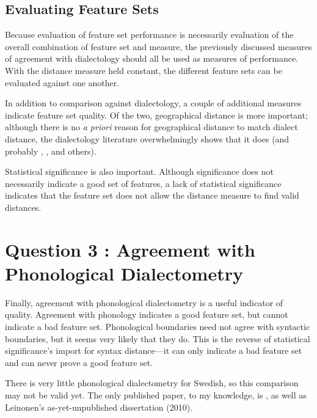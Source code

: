 \subsection{Evaluating Feature Sets}

Because evaluation of feature set performance is necessarily evaluation
of the overall combination of feature set and measure, the previously
discussed measures of agreement with dialectology should all be used
as measures of performance. With the distance measure held constant,
the different feature sets can be evaluated against one another.

In addition to comparison against dialectology, a couple of additional
measures indicate feature set quality. Of the two, geographical
distance is more important; although there is no {\it a priori} reason
for geographical distance to match dialect distance, the dialectology
literature overwhelmingly shows that it does \cite{gooskens04a} (and
probably \cite{heeringa04}, \cite{kondrak02}, and others).

Statistical significance is also important. Although significance does not
necessarily indicate a good set of features, a lack of statistical
significance indicates that the feature set does not allow the distance
measure to find valid distances.

\section{Question 3 : Agreement with Phonological Dialectometry}

Finally, agreement with phonological dialectometry is a useful
indicator of quality. Agreement with phonology indicates a good
feature set, but cannot indicate a bad feature set. Phonological
boundaries need not agree with syntactic boundaries, but it seems very
likely that they do. This is the reverse of statistical significance's
import for syntax distance---it can only indicate a bad feature set
and can never prove a good feature set.

There is very little phonological dialectometry for Swedish, so this
comparison may not be valid yet. The only published paper, to my knowledge, is
, as well as Leinonen's as-yet-unpublished dissertation
(2010).


